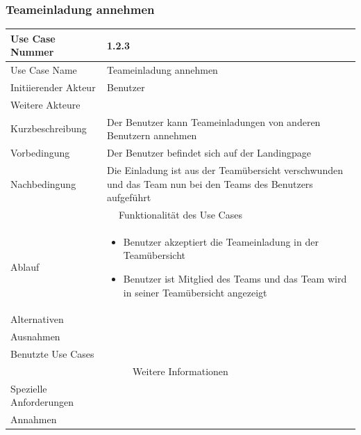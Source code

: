 \documentclass[10pt,a4paper]{article}
\begin{document}
		\subsubsection{Teameinladung annehmen}		
		\begin{tabularx}{\textwidth}{|l|X|}
			\hline Use Case Nummer & 1.2.3 \\ 
			\hline Use Case Name & Teameinladung annehmen \\ 
			\hline Initiierender Akteur & Benutzer \\
			\hline Weitere Akteure & \\
			\hline Kurzbeschreibung & Der Benutzer kann Teameinladungen von anderen Benutzern annehmen \\
			\hline Vorbedingung & Der Benutzer befindet sich auf der Landingpage \\
			\hline Nachbedingung & Die Einladung ist aus der Teamübersicht verschwunden und das Team nun bei den Teams des Benutzers aufgeführt \\
			\hline \multicolumn{2}{|c|}{Funktionalität des Use Cases}\\
			\hline Ablauf & \begin{itemize}
				\item Benutzer akzeptiert die Teameinladung in der Teamübersicht
				\item Benutzer ist Mitglied des Teams und das Team wird in seiner Teamübersicht angezeigt
			\end{itemize} \\
			\hline Alternativen & \\
			\hline Ausnahmen & \\
			\hline Benutzte Use Cases & \\
			\hline \multicolumn{2}{|c|}{Weitere Informationen} \\
			\hline Spezielle Anforderungen & \\
			\hline Annahmen & \\
			\hline
		\end{tabularx}
			
\end{document}
